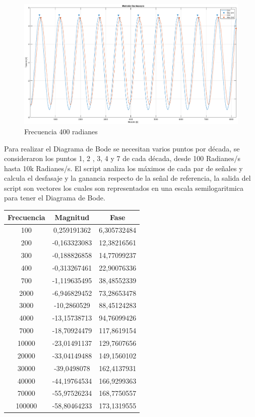 \documentclass[10pt,a4paper]{article} %
\begin{document}
\begin{figure}[H]
	\begin{center}
		\includegraphics[scale=0.3]{osciloscopio}
		\caption{Frecuencia 400 radianes}
	\end{center}
\end{figure}

Para realizar el Diagrama de Bode se necesitan varios puntos por década, se consideraron los puntos 1, 2 , 3, 4 y 7 de cada década, desde 100 Radianes/s hasta 10k Radianes/s. El script analiza los máximos de cada par de señales y calcula el desfasaje y la ganancia respecto de la señal de referencia, la salida del script son vectores los cuales son representados en una escala semilogaritmica para tener el Diagrama de Bode.

\begin{center}
\begin{tabular}{|c|c|c|}
	\hline 
	Frecuencia & Magnitud & Fase
	\\ 
	\hline 
	100 & 0,259191362 & 6,305732484
	\\ 
	\hline 
	200 & -0,163323083
	& 12,38216561
	\\ 
	\hline 
	300 & -0,188826858
	& 14,77099237
	\\ 
	\hline 
	400 & -0,313267461
	& 22,90076336
	\\ 
	\hline 
	700 & -1,119635495
	& 38,48552339
	\\ 
	\hline 
	2000 & -6,946829452
	& 73,28653478
	\\ 
	\hline 
	3000 & -10,2860529
	& 88,45124283
	\\ 
	\hline 
	4000 & -13,15738713
	& 94,76099426
	\\ 
	\hline 
	7000 & -18,70924479
	& 117,8619154
	\\ 
	\hline 
	10000 & -23,01491137
	& 129,7607656
	\\ 
	\hline 
	20000 & -33,04149488
	& 149,1560102
	\\ 
	\hline 
	30000 & -39,0498078
	& 162,4137931
	\\ 
	\hline 
	40000 & -44,19764534
	& 166,9299363
	\\ 
	\hline 
	70000 & -55,97526234
	& 168,7750557
	\\ 
	\hline 
	100000 & -58,80464233
	& 173,1319555
	\\ 
	\hline 
\end{tabular}   
\end{center} 
\end{document}
